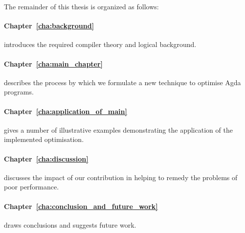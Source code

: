 The remainder of this thesis is organized as follows:

\paragraph{Chapter~\ref{cha:background}} introduces the required compiler theory and logical background.


\paragraph{Chapter~\ref{cha:main_chapter}} describes the process by which we formulate a new technique to optimise Agda programs.

\paragraph{Chapter~\ref{cha:application_of_main}} gives a number of illustrative examples demonstrating the application of the implemented optimisation.


\paragraph{Chapter~\ref{cha:discussion}} discusses the impact of our contribution in helping to remedy the problems of poor performance.

\paragraph{Chapter~\ref{cha:conclusion_and_future_work}} draws conclusions and suggests future work.

